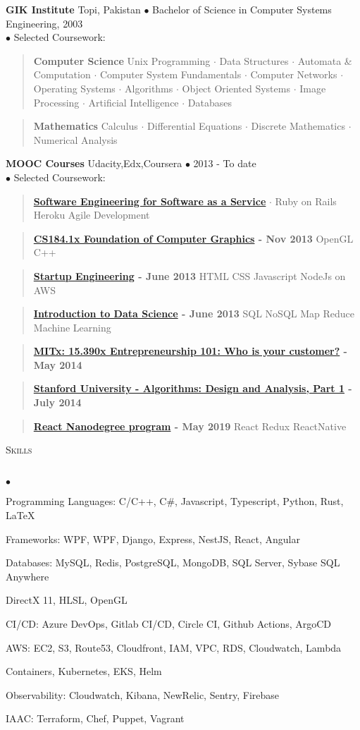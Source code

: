 \documentclass{article}
\newcommand{\area}[2]{\vspace*{-9pt} \begin{verse}\textbf{#1}   #2 \end{verse}  }
\newcommand{\lineunder}{\vspace*{-8pt} \\ \hspace*{-18pt} \hrulefill \\}
\newcommand{\header}[1]{{\hspace*{-15pt}\vspace*{6pt} \textsc{#1}} \vspace*{-6pt} \lineunder}
\newenvironment{achievements}{\begin{list}{$\bullet$}{\topsep 0pt \itemsep -2pt}}{\vspace*{4pt}\end{list}}
\newcommand{\schoolwithcourses}[4]{
 \textbf{#1} #2 $\bullet$ #3\\ 
#4 $\bullet$  Selected Coursework:\\
\vspace*{5pt}
}
\begin{document}
\schoolwithcourses{GIK Institute}{Topi, Pakistan}{Bachelor of Science in Computer Systems Engineering, 2003}
{}
	\area{Computer Science}{ Unix Programming $\cdot$ Data Structures $\cdot$ Automata \& Computation $\cdot$ Computer System Fundamentals $\cdot$ Computer Networks $\cdot$ Operating Systems $\cdot$
 Algorithms $\cdot$ Object Oriented Systems $\cdot$ Image Processing $\cdot$
Artificial Intelligence $\cdot$ Databases}
	\area{Mathematics}{Calculus $\cdot$ Differential Equations $\cdot$ Discrete Mathematics $\cdot$ Numerical Analysis}
\schoolwithcourses{MOOC Courses}{Udacity,Edx,Coursera}{2013 - To date}
{}
	\area{\href{https://www.class-central.com/mooc/305/coursera-software-as-a-service}{Software Engineering for Software as a Service}}{ $\cdot$ Ruby on Rails Heroku Agile Development}
	\area{\href{https://www.edx.org/course/uc-berkeleyx/uc-berkeleyx-cs-184-1x-foundations-1003}{CS184.1x Foundation of Computer Graphics} - Nov 2013}{ OpenGL C++}
	\area{\href{https://www.coursera.org/course/startup}{Startup Engineering} - June 2013}{ HTML CSS Javascript NodeJs on AWS}
	\area{\href{https://www.coursera.org/course/datasci}{Introduction to Data Science} - June 2013}{SQL NoSQL Map Reduce Machine Learning}
	\area{\href{https://class.coursera.org/hetero-002}{MITx: 15.390x Entrepreneurship 101: Who is your customer?} - May 2014}{}
	\area{\href{https://www.class-central.com/course/coursera-algorithms-design-and-analysis-part-1-374}{Stanford University - Algorithms: Design and Analysis, Part 1} - July 2014}{}
	\area{\href{https://www.udacity.com/course/react-nanodegree--nd019}{React Nanodegree program} - May 2019}{ React Redux ReactNative}
\clearpage

\header{Skills}
\begin{achievements}
\item Programming Languages: C/C++, C\#, Javascript, Typescript, Python, Rust, \LaTeX
\item Frameworks: WPF, WPF, Django, Express, NestJS, React, Angular
\item Databases: MySQL, Redis, PostgreSQL, MongoDB, SQL Server, Sybase SQL Anywhere
\item DirectX 11, HLSL, OpenGL 
\item CI/CD: Azure DevOps, Gitlab CI/CD, Circle CI, Github Actions, ArgoCD
\item AWS: EC2, S3, Route53, Cloudfront, IAM, VPC, RDS, Cloudwatch, Lambda
\item Containers, Kubernetes, EKS, Helm
\item Observability: Cloudwatch, Kibana, NewRelic, Sentry, Firebase
\item IAAC: Terraform, Chef, Puppet, Vagrant
\end{achievements}
\end{document}

